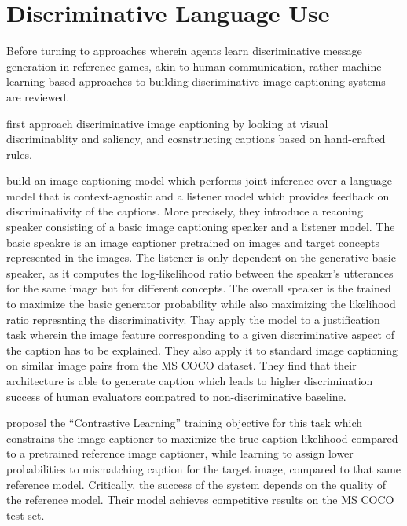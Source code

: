 

\section{Discriminative Language Use}

Before turning to approaches wherein agents learn discriminative message generation in reference games, akin to human communication, rather machine learning-based approaches to building discriminative image captioning systems are reviewed.  

\cite{sadovnik2012image} first approach discriminative image captioning by looking at visual discriminablity and saliency, and cosnstructing captions based on hand-crafted rules.

\cite{vedantam2017context} build an image captioning model which performs joint inference over a language model that is context-agnostic and a listener model which provides feedback on discriminativity of the captions. More precisely, they introduce a reaoning speaker consisting of a basic image captioning speaker and a listener model. The basic speakre is an image captioner pretrained on images and target concepts represented in the images. The listener is only dependent on the generative basic speaker, as it computes the log-likelihood ratio between the speaker's utterances for the same image but for different concepts. The overall speaker is the trained to maximize the basic generator probability while also maximizing the likelihood ratio represnting the discriminativity.
Thay apply the model to a justification task wherein the image feature corresponding to a given discriminative aspect of the caption has to be explained. They also apply it to standard image captioning on similar image pairs from the MS COCO dataset. They find that their architecture is able to generate caption which leads to higher discrimination success of human evaluators compatred to non-discriminative baseline.

\cite{dai2017contrastive} proposel the ``Contrastive Learning'' training objective for this task which constrains the image captioner to maximize the true caption likelihood compared to a pretrained reference image captioner, while learning to assign lower probabilities to mismatching caption for the target image, compared to that same reference model. Critically, the success of the system depends on the quality of the reference model. Their model achieves competitive results on the MS COCO test set.

